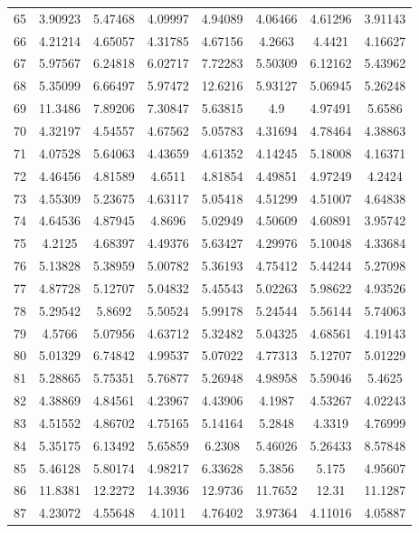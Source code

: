 \begin{center}
\begin{longtable}{cccccccc}
65 & 3.90923 & 5.47468 & 4.09997 & 4.94089 & 4.06466 & 4.61296 & 3.91143\\
66 & 4.21214 & 4.65057 & 4.31785 & 4.67156 & 4.2663 & 4.4421 & 4.16627\\
67 & 5.97567 & 6.24818 & 6.02717 & 7.72283 & 5.50309 & 6.12162 & 5.43962\\
68 & 5.35099 & 6.66497 & 5.97472 & 12.6216 & 5.93127 & 5.06945 & 5.26248\\
69 & 11.3486 & 7.89206 & 7.30847 & 5.63815 & 4.9 & 4.97491 & 5.6586\\
70 & 4.32197 & 4.54557 & 4.67562 & 5.05783 & 4.31694 & 4.78464 & 4.38863\\
71 & 4.07528 & 5.64063 & 4.43659 & 4.61352 & 4.14245 & 5.18008 & 4.16371\\
72 & 4.46456 & 4.81589 & 4.6511 & 4.81854 & 4.49851 & 4.97249 & 4.2424\\
73 & 4.55309 & 5.23675 & 4.63117 & 5.05418 & 4.51299 & 4.51007 & 4.64838\\
74 & 4.64536 & 4.87945 & 4.8696 & 5.02949 & 4.50609 & 4.60891 & 3.95742\\
75 & 4.2125 & 4.68397 & 4.49376 & 5.63427 & 4.29976 & 5.10048 & 4.33684\\
76 & 5.13828 & 5.38959 & 5.00782 & 5.36193 & 4.75412 & 5.44244 & 5.27098\\
77 & 4.87728 & 5.12707 & 5.04832 & 5.45543 & 5.02263 & 5.98622 & 4.93526\\
78 & 5.29542 & 5.8692 & 5.50524 & 5.99178 & 5.24544 & 5.56144 & 5.74063\\
79 & 4.5766 & 5.07956 & 4.63712 & 5.32482 & 5.04325 & 4.68561 & 4.19143\\
80 & 5.01329 & 6.74842 & 4.99537 & 5.07022 & 4.77313 & 5.12707 & 5.01229\\
81 & 5.28865 & 5.75351 & 5.76877 & 5.26948 & 4.98958 & 5.59046 & 5.4625\\
82 & 4.38869 & 4.84561 & 4.23967 & 4.43906 & 4.1987 & 4.53267 & 4.02243\\
83 & 4.51552 & 4.86702 & 4.75165 & 5.14164 & 5.2848 & 4.3319 & 4.76999\\
84 & 5.35175 & 6.13492 & 5.65859 & 6.2308 & 5.46026 & 5.26433 & 8.57848\\
85 & 5.46128 & 5.80174 & 4.98217 & 6.33628 & 5.3856 & 5.175 & 4.95607\\
86 & 11.8381 & 12.2272 & 14.3936 & 12.9736 & 11.7652 & 12.31 & 11.1287\\
87 & 4.23072 & 4.55648 & 4.1011 & 4.76402 & 3.97364 & 4.11016 & 4.05887\\

\end{longtable}
\end{center}

